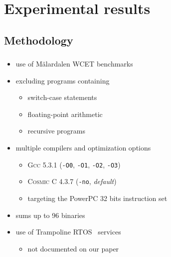 \documentclass{beamer}
\begin{document}
  
  \section{Experimental results}
  \begin{frame}
    \frametitle{\secname}
    \tableofcontents[currentsection]
  \end{frame}
  
  \subsection{Methodology}
  \begin{frame}
    \frametitle{\secname}
    \framesubtitle{\subsecname}

    \begin{itemize}
      \item use of Mälardalen WCET benchmarks
      \item excluding programs containing %
        \begin{itemize}
          \item switch-case statements %
          \item floating-point arithmetic %
          \item recursive programs
        \end{itemize}
      \item multiple compilers and optimization options
        \begin{itemize}
          \item \textsc{Gcc} 5.3.1 (\texttt{-O0}, \texttt{-O1}, \texttt{-O2}, \texttt{-O3})
          \item \textsc{Cosmic C} 4.3.7 (\texttt{-no}, \emph{default})
          \item targeting the PowerPC 32 bits instruction set
        \end{itemize}
      \item sums up to 96 binaries

      \vspace{1em}
      \item use of Trampoline RTOS~\cite{BBF06} services
        \begin{itemize}
          \item not documented on our paper
        \end{itemize}
    \end{itemize}
  \end{frame}
  
\end{document}
